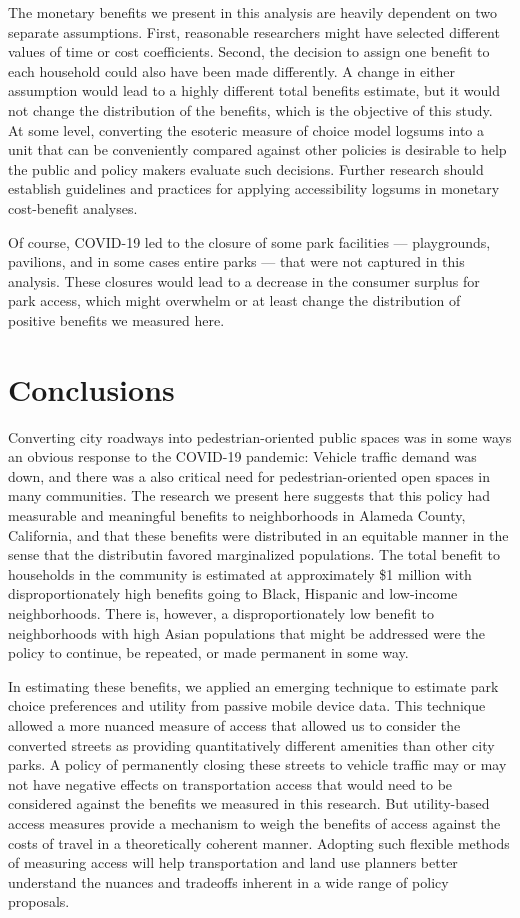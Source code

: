 \documentclass[3p, authoryear, review]{elsarticle} %
\begin{document}
The monetary benefits we present in this analysis are heavily dependent on
two separate assumptions. First, reasonable researchers might have selected
different values of time or cost coefficients. Second, the decision to assign
one benefit to each household could also have been made
differently. A change in either assumption would lead to a highly different
total benefits estimate, but it would not change the distribution of the
benefits, which is the objective of this study. At some level, converting the
esoteric measure of choice model logsums into a unit that can be conveniently
compared against other policies is desirable to help the public and policy
makers evaluate such decisions. Further research should establish guidelines and
practices for applying accessibility logsums in monetary cost-benefit analyses.

Of course, COVID-19 led to the closure of some park facilities --- playgrounds,
pavilions, and in some cases entire parks --- that were not captured in this
analysis. These closures would lead to a decrease in the consumer surplus for
park access, which might overwhelm or at least change the distribution of
positive benefits we measured here.

\hypertarget{conclusions}{%
\section{Conclusions}\label{conclusions}}

Converting city roadways into pedestrian-oriented public spaces was in some ways
an obvious response to the COVID-19 pandemic: Vehicle traffic demand was down,
and there was a also critical need for pedestrian-oriented open spaces in many
communities. The research we present here suggests that this policy had
measurable and meaningful benefits to neighborhoods in Alameda County,
California, and that these benefits were distributed in an equitable manner in the sense that the distributin favored marginalized populations. The total benefit to households in the community is estimated
at approximately \$1 million with disproportionately high benefits going to
Black, Hispanic and low-income neighborhoods. There is, however, a
disproportionately low benefit to neighborhoods with high Asian populations that
might be addressed were the policy to continue, be repeated, or made permanent
in some way.

In estimating these benefits, we applied an emerging technique to estimate park
choice preferences and utility from passive mobile device data. This technique
allowed a more nuanced measure of access that allowed us to consider the
converted streets as providing quantitatively different amenities than other city
parks. A policy of permanently closing these streets to vehicle traffic may or
may not have negative effects on transportation access that would need to be
considered against the benefits we measured in this research. But utility-based
access measures provide a mechanism to weigh the benefits of access against the
costs of travel in a theoretically coherent manner. Adopting such flexible
methods of measuring access will help transportation and land use planners
better understand the nuances and tradeoffs inherent in a wide range of policy
proposals.
\end{document}
